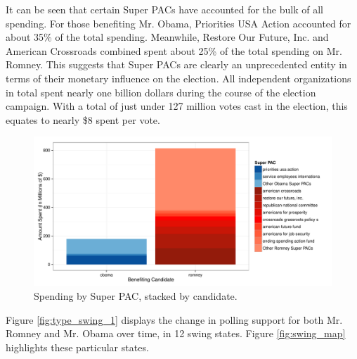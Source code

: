\documentclass[11pt]{article}\usepackage{graphicx, color}
\newenvironment{knitrout}{}{} %
\begin{document}
It can be seen that certain Super PACs have accounted for the bulk of all spending. For those benefiting Mr. Obama, Priorities USA Action accounted for about 35\% of the total spending. Meanwhile, Restore Our Future, Inc. and American Crossroads combined spent about 25\% of the total spending on Mr. Romney. This suggests that Super PACs are clearly an unprecedented entity in terms of their monetary influence on the election. All independent organizations in total spent nearly one billion dollars during the course of the election campaign. With a total of just under 127 million votes cast in the election, this equates to nearly \$8 spent per vote.

\begin{knitrout}
\color{fgcolor}\begin{figure}[H]


{\centering \includegraphics[width=\textwidth]{figure/PAC_plot} 

}

\caption[Spending by Super PAC, stacked by candidate]{Spending by Super PAC, stacked by candidate.\label{fig:PAC_plot}}
\end{figure}


\end{knitrout}





Figure \ref{fig:type_swing_1} displays the change in polling support for both Mr. Romney and Mr. Obama over time, in 12 swing states. Figure \ref{fig:swing_map} highlights these particular states.
\end{document}
